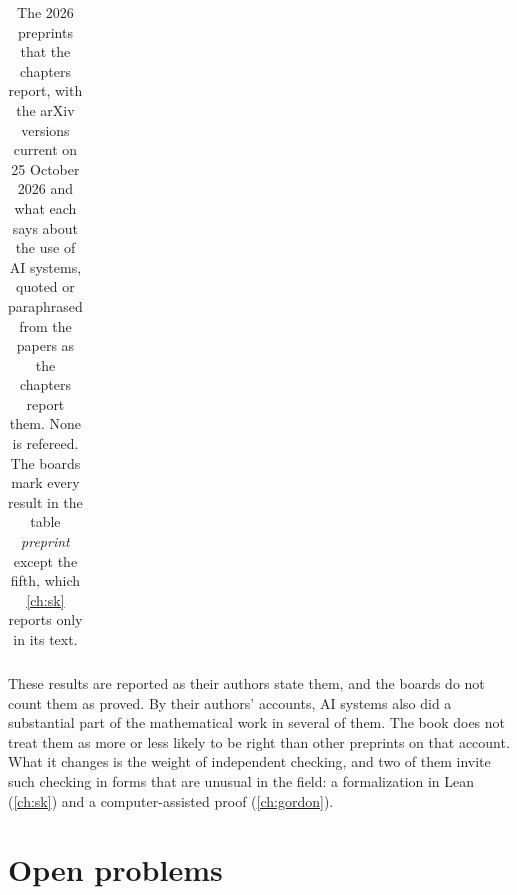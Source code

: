 \begin{refsection}
\begin{table}[t]
\begin{fullwidth}
\begin{tabularx}{\linewidth}{@{}>{\raggedright\arraybackslash}p{38mm}>{\raggedright\arraybackslash}p{30mm}>{\raggedright\arraybackslash}X@{}}
\bottomrule
\end{tabularx}
\end{fullwidth}
\caption{The 2026 preprints that the chapters report, with the arXiv versions current on 25 October 2026 and what each says about the use of AI systems, quoted or paraphrased from the papers as the chapters report them. None is refereed. The boards mark every result in the table \emph{preprint} except the fifth, which \cref{ch:sk} reports only in its text.}\label{tab:epilogue:preprints}
\end{table}

These results are reported as their authors state them, and the boards do not count them as proved. By their authors' accounts, AI systems also did a substantial part of the mathematical work in several of them. The book does not treat them as more or less likely to be right than other preprints on that account. What it changes is the weight of independent checking, and two of them invite such checking in forms that are unusual in the field: a formalization in Lean (\cref{ch:sk}) and a computer-assisted proof (\cref{ch:gordon}).

\section*{Open problems}


\end{refsection}
